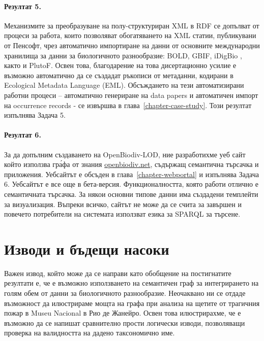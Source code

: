 \paragraph{Резултат 5.} Механизмите за преобразуване на полу-структуриран XML в RDF се допълват от процеси за работа, които позволяват обогатяването на XML статии, публикувани от Пенсофт, чрез автоматично импортиране на данни от основните международни хранилища за данни за биологичното разнообразие: BOLD, GBIF, iDigBio , както и PlutoF. Освен това, благодарение на това дисертационно усилие е възможно автоматично да се създадат ръкописи от метаданни, кодирани в Ecological Metadata Language (EML). Обсъждането на тези автоматизирани работни процеси -- автоматично генериране на data papers и автоматичен импорт на occurrence records - се извършва в глава~\ref{chapter-case-study}. Този резултат изпълнява Задача 5.

\paragraph{Резултат 6.} За да допълним създаването на OpenBiodiv-LOD, ние разработихме уеб сайт който използва гр\'{а}фа от знания \href{http://openbiodiv.net}{openbiodiv.net}, съдържащ семантична търсачка и приложения. Уебсайтът е обсъден в глава~\ref{chapter-webportal} и изпълнява Задача 6. Уебсайтът е все още в бета-версия. Функционалността, която работи отлично е семантичната търсачка. За някои основни типове данни има създадени темплейти за визуализация. Въпреки всичко, сайтът не може да се счита за завършен и повечето потребители на системата използват езика за SPARQL за търсене.

\section*{Изводи и бъдещи насоки}

Важен извод, който може да се направи като обобщение на постигнатите резултати е, че е възможно използването на семантичен граф за интегрирането на голям обем от данни за биологичното разнообразие. Неочаквано ни се отдаде възможност да илюстрираме мощта на графа при анализа на щетите от трагичния пожар в Museu Nacional в Рио де Жанейро. Освен това илюстрирахме, че е възможно да се напишат сравнително прости логически изводи, позволяващи проверка на валидността на дадено таксономично име.

